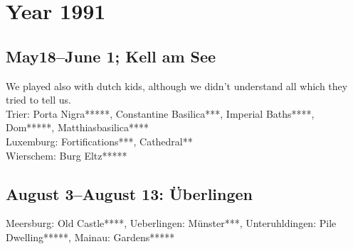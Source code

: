 \chapter{Year 1991}
\label{1991}

\section{May18--June 1; Kell am See}
\label{1991:Kell}


We played also with dutch kids, although we didn't understand all which they tried to tell us.\\

Trier: Porta Nigra*****, Constantine Basilica***, Imperial Baths****, Dom*****, Matthiasbasilica****\\
Luxemburg: Fortifications***, Cathedral**\\
Wierschem: Burg Eltz*****\\

\section{August 3--August 13: \"Uberlingen}
\label{1991:Uberlingen}


Meersburg: Old Castle****, Ueberlingen: M\"unster***, Unteruhldingen: Pile Dwelling*****, Mainau: Gardens*****